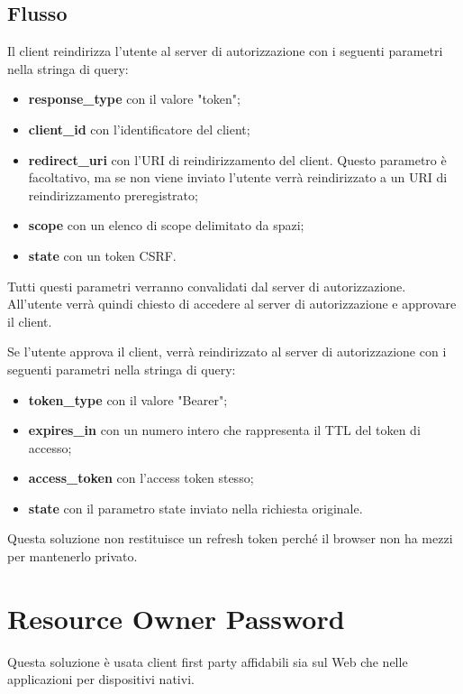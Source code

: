 \subsection{Flusso}
Il client reindirizza l'utente al server di autorizzazione con i seguenti parametri nella stringa di query:
\begin{itemize}
    \item \textbf{response\_type} con il valore "token";
    \item \textbf{client\_id} con l'identificatore del client;
    \item \textbf{redirect\_uri} con l'URI di reindirizzamento del client. Questo parametro è facoltativo, ma se non viene inviato l'utente verrà reindirizzato a un URI di reindirizzamento preregistrato;
    \item \textbf{scope} con un elenco di scope delimitato da spazi;
    \item \textbf{state} con un token CSRF.
\end{itemize}

\noindent Tutti questi parametri verranno convalidati dal server di autorizzazione. All'utente verrà quindi chiesto di accedere al server di autorizzazione e approvare il client.

Se l'utente approva il client, verrà reindirizzato al server di autorizzazione con i seguenti parametri nella stringa di query:
\begin{itemize}
    \item \textbf{token\_type} con il valore "Bearer";
    \item \textbf{expires\_in} con un numero intero che rappresenta il TTL del token di accesso;
    \item \textbf{access\_token} con l'access token stesso;
    \item \textbf{state} con il parametro state inviato nella richiesta originale.
\end{itemize}

\noindent Questa soluzione non restituisce un refresh token perché il browser non ha mezzi per mantenerlo privato.

\section{Resource Owner Password}
Questa soluzione è usata client first party affidabili sia sul Web che nelle applicazioni per dispositivi nativi.

